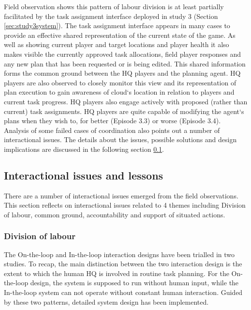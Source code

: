 Field observation shows this pattern of labour division is at least partially facilitated by the task assignment interface deployed in study 3 (Section \ref{sec:study3system}). The task assignment interface appears in many cases to provide an effective shared representation of the current state of the game. As well as showing current player and target locations and player health it also makes visible the currently approved task allocations, field player responses and any new plan that has been requested or is being edited. This shared information forms the common ground between the HQ players and the planning agent. HQ players are also observed to closely monitor this view and its representation of plan execution to gain awareness of cloud`s location in relation to players and current task progress. HQ players also engage actively with proposed (rather than current) task assignments. HQ players are quite capable of modifying the agent`s plans when they wish to, for better (Episode 3.3) or worse (Episode 3.4).\\

Analysis of some failed cases of coordination also points out a number of interactional issues. The details about the issues, possible solutions and design implications are discussed in the following section \ref{sec:conclusionIssue}. \\


\subsection{Interactional issues and lessons}\label{sec:conclusionIssue}
There are a number of interactional issues emerged from the field observations. This section reflects on interactional issues related to 4 themes including Division of labour, common ground, accountability and support of situated actions.

\subsubsection{Division of labour}\label{sec:conclusionHH}
The On-the-loop and In-the-loop interaction designs have been trialled in two studies. To recap, the main distinction between the two interaction design is the extent to which the human HQ is involved in routine task planning. For the On-the-loop design, the system is supposed to run without human input, while the In-the-loop system can not operate without constant human interaction. Guided by these two patterns, detailed system design has been implemented.\\

